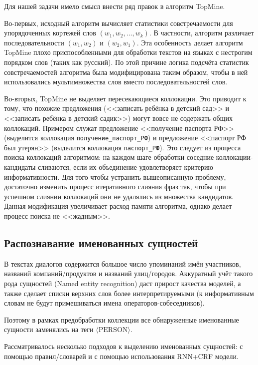 Для нашей задачи имело смысл внести ряд правок в алгоритм TopMine.

Во-первых, исходный алгоритм вычисляет статистики совстречаемости для упорядоченных кортежей слов $(w_1, w_2, \dots, w_k)$. В частности, алгоритм различает последовательности $(w_1, w_2)$ и $(w_2, w_1)$. Эта особенность делает алгоритм TopMine плохо приспособленными для обработки текстов на языках с нестрогим порядком слов (таких как русский). По этой причине логика подсчёта статистик совстречаемостей алгоритма была модифицирована таким образом, чтобы в ней использовались мультимножества слов вместо последовательностей слов.

Во-вторых, TopMine не выделяет пересекающиеся коллокации. Это приводит к тому, что похожие предложения (<<записать ребёнка в детский сад>> и <<записать ребёнка в детский садик>>) могут вовсе не содержать общих коллокаций. Примером служат предложение <<получение паспорта РФ>> (выделится коллокация \texttt{получение\_паспорт\_РФ}) и предложение <<паспорт РФ был утерян>> (выделится коллокация \texttt{паспорт\_РФ}). Это следует из процесса поиска коллокаций алгоритмом: на каждом шаге обработки соседние коллокации-кандидаты сливаются, если их объединение удовлетворяет критерию информативности. Для того чтобы устранить вышеописанную проблему, достаточно изменить процесс итеративного слияния фраз так, чтобы при успешном слиянии коллокаций они не удалялись из множества кандидатов. Данная модификация увеличивает расход памяти алгоритма, однако делает процесс поиска не <<жадным>>.

\subsection{Распознавание именованных сущностей}

\par В текстах диалогов содержится большое число упоминаний имён участников, названий компаний/продуктов и названий улиц/городов. Аккуратный учёт такого рода сущностей (Named entity recognition) даст прирост качества моделей, а также сделает списки верхних слов более интерпретируемыми (к информативным словам не будут примешиваться имена операторов-собеседников).

Поэтому в рамках предобработки коллекции все обнаруженные именованные сущности заменялись на теги $\langle \mathrm{PERSON} \rangle$.

Рассматривалось несколько подходов к выделению именованных сущностей: с помощью правил/словарей и с помощью использования RNN+CRF модели.

